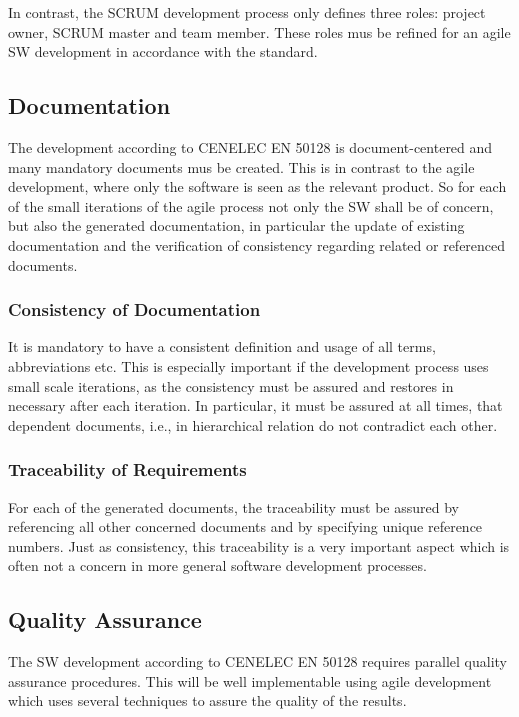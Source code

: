 In contrast, the SCRUM development process only defines three roles: project
owner, SCRUM master and team member. These roles mus be refined for an agile SW
development in accordance with the standard.

\subsection{Documentation}
\label{sec:documentation}

The development according to CENELEC EN 50128 is document-centered and many
mandatory documents mus be created. This is in contrast to the agile
development, where only the software is seen as the relevant product. So for
each of the small iterations of the agile process not only the SW shall be of
concern, but also the generated documentation, in particular the update of
existing documentation and the verification of consistency regarding related or
referenced documents.

\subsubsection{Consistency of Documentation}
\label{sec:cons-docum}

It is mandatory to have a consistent definition and usage of all terms,
abbreviations etc. This is especially important if the development process uses
small scale iterations, as the consistency must be assured and restores in
necessary after each iteration. In particular, it must be assured at all times,
that dependent documents, i.e., in hierarchical relation do not contradict each
other.

\subsubsection{Traceability of Requirements}
\label{sec:trac-requ}

For each of the generated documents, the traceability must be assured by
referencing all other concerned documents and by specifying unique reference
numbers. Just as consistency, this traceability is a very important aspect which
is often not a concern in more general software development processes.


\subsection{Quality Assurance}
\label{sec:quality-assurance}

The SW development according to CENELEC EN 50128 requires parallel quality
assurance procedures. This will be well implementable using agile development
which uses several techniques to assure the quality of the results.



